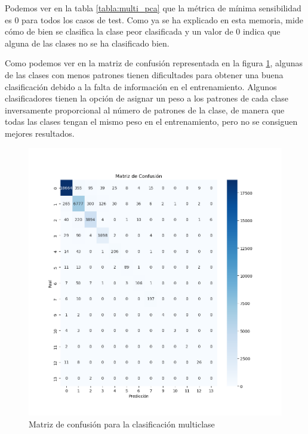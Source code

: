 \vspace{1em}

Podemos ver en la tabla \ref{tabla:multi_pca} que la métrica de mínima sensibilidad es 0 para todos los casos de test. Como ya se ha explicado en esta memoria, mide cómo de bien se clasifica la clase peor clasificada y un valor de 0 indica que alguna de las clases no se ha clasificado bien.

\vspace{1em}

Como podemos ver en la matriz de confusión representada en la figura \ref{fig:confusion}, algunas de las clases con menos patrones tienen dificultades para obtener una buena clasificación debido a la falta de información en el entrenamiento. Algunos clasificadores tienen la opción de asignar un peso a los patrones de cada clase inversamente proporcional al número de patrones de la clase, de manera que todas las clases tengan el mismo peso en el entrenamiento, pero no se consiguen mejores resultados.

\begin{figure}[H]
	\centering
	\includegraphics[width=1.2\linewidth]{Imagenes/confusion_multiclase}
	\caption[Matriz de confusión para la clasificación multiclase]{Matriz de confusión para la clasificación multiclase}
	\label{fig:confusion}
\end{figure}

